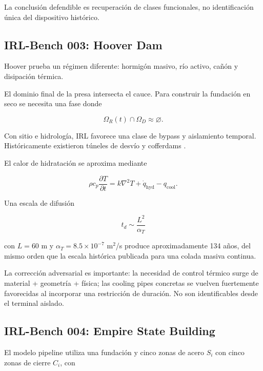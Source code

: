 La conclusión defendible es recuperación de clases funcionales, no identificación única del dispositivo histórico.

\subsection{IRL-Bench 003: Hoover Dam}

Hoover prueba un régimen diferente: hormigón masivo, río activo, cañón y disipación térmica.

El dominio final de la presa intersecta el cauce. Para construir la fundación en seco se necesita una fase donde

\begin{equation}
\Omega_R(t)\cap\Omega_D\approx\varnothing.
\end{equation}

Con sitio e hidrología, IRL favorece una clase de bypass y aislamiento temporal. Históricamente existieron túneles de desvío y cofferdams \cite{hooverhistory,hooverconcrete,hoovertunnels,hoovercoffer}.

El calor de hidratación se aproxima mediante

\begin{equation}
\rho c_p
\frac{\partial T}{\partial t}
=
k\nabla^2T
+
\dot q_{\mathrm{hyd}}
-
q_{\mathrm{cool}}.
\end{equation}

Una escala de difusión

\begin{equation}
t_d
\sim
\frac{L^2}{\alpha_T}
\end{equation}

con \(L=60\) m y \(\alpha_T=8.5\times10^{-7}\) m\(^2\)/s produce aproximadamente 134 años, del mismo orden que la escala histórica publicada para una colada masiva continua.

La corrección adversarial es importante: la necesidad de control térmico surge de material + geometría + física; las cooling pipes concretas se vuelven fuertemente favorecidas al incorporar una restricción de duración. No son identificables desde el terminal aislado.

\subsection{IRL-Bench 004: Empire State Building}

El modelo pipeline utiliza una fundación y cinco zonas de acero \(S_i\) con cinco zonas de cierre \(C_i\), con

